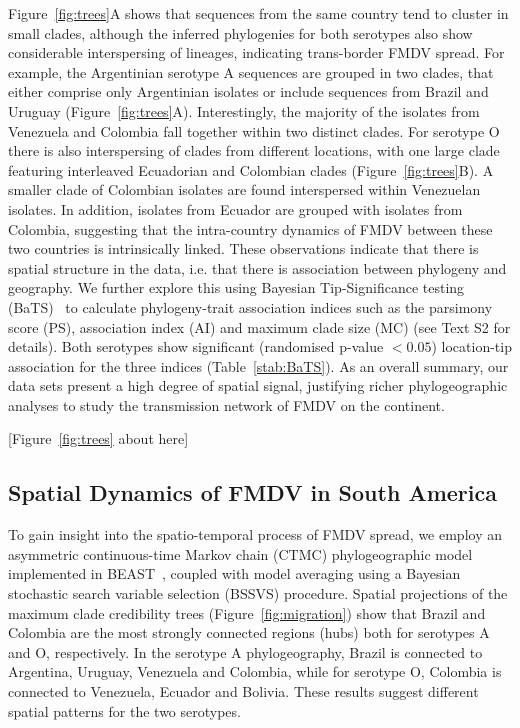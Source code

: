 \documentclass[10pt]{article}
\begin{document}
Figure~\ref{fig:trees}A shows that sequences from the same country tend to cluster in small clades, although the inferred phylogenies for both serotypes also show considerable interspersing of lineages, indicating trans-border FMDV spread.
For example, the Argentinian serotype A sequences are grouped in two clades, that either comprise only Argentinian isolates or include sequences from Brazil and Uruguay (Figure~\ref{fig:trees}A).
Interestingly, the majority of the isolates from Venezuela and Colombia fall together within two distinct clades.
For serotype O there is also interspersing of clades from different locations, with one large clade featuring interleaved Ecuadorian and Colombian clades (Figure~\ref{fig:trees}B).
A smaller clade of Colombian isolates are found interspersed within Venezuelan isolates.
In addition, isolates from Ecuador are grouped with isolates from Colombia, suggesting that the intra-country dynamics of FMDV between these two countries is intrinsically linked.
These observations indicate that there is spatial structure in the data, i.e. that there is association between phylogeny and geography.
We further explore this using Bayesian Tip-Significance testing (BaTS)~\cite{bats} to calculate phylogeny-trait association indices such as the parsimony score (PS), association index (AI) and maximum clade size (MC) (see Text S2 for details).
Both serotypes show significant (randomised p-value $< 0.05$) location-tip association for the three indices (Table~\ref{stab:BaTS}).
As an overall summary, our data sets present a high degree of spatial signal, justifying richer phylogeographic analyses to study the transmission network of FMDV on the continent.

\begin{center}
 [Figure~\ref{fig:trees} about here]
\end{center}

\subsection*{Spatial Dynamics of FMDV in South America}

To gain insight into the spatio-temporal process of FMDV spread, we employ an asymmetric continuous-time Markov chain (CTMC) phylogeographic model~\cite{roots} implemented in BEAST~\cite{beast2012}, coupled with model averaging using a Bayesian stochastic search variable selection (BSSVS) procedure.
Spatial projections of the maximum clade credibility trees (Figure~\ref{fig:migration}) show that Brazil and Colombia are the most strongly connected regions (hubs) both for serotypes A and O, respectively. 
In the serotype A phylogeography, Brazil is connected to Argentina, Uruguay, Venezuela and Colombia, while for serotype O, Colombia is connected to Venezuela, Ecuador and Bolivia.
These results suggest different spatial patterns for the two serotypes.
\end{document}
